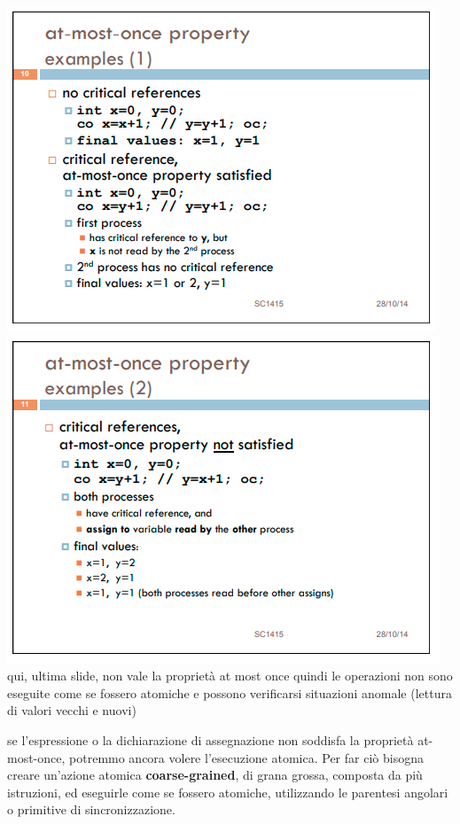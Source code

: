 \documentclass[10pt,a4paper]{article}
\begin{document}
\includegraphics[scale=0.65]{img/mostonce.png} \\
\includegraphics[scale=0.65]{img/mostonce2.png} 
qui, ultima slide, non vale la proprietà at most once quindi le operazioni non sono eseguite come se fossero atomiche e possono verificarsi situazioni anomale (lettura di valori vecchi e nuovi)

se l'espressione o la dichiarazione di assegnazione non soddisfa
la proprietà at-most-once, potremmo ancora volere l'esecuzione atomica. Per far ciò bisogna creare un'azione atomica \textbf{coarse-grained}, di grana grossa, composta da più istruzioni, ed eseguirle come se fossero atomiche, utilizzando le parentesi angolari o primitive di sincronizzazione.
\end{document}
